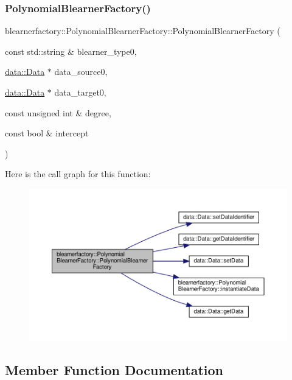 \subsubsection{\texorpdfstring{Polynomial\+Blearner\+Factory()}{PolynomialBlearnerFactory()}}
{\footnotesize\ttfamily blearnerfactory\+::\+Polynomial\+Blearner\+Factory\+::\+Polynomial\+Blearner\+Factory (\begin{DoxyParamCaption}\item[{const std\+::string \&}]{blearner\+\_\+type0,  }\item[{\hyperlink{classdata_1_1_data}{data\+::\+Data} $\ast$}]{data\+\_\+source0,  }\item[{\hyperlink{classdata_1_1_data}{data\+::\+Data} $\ast$}]{data\+\_\+target0,  }\item[{const unsigned int \&}]{degree,  }\item[{const bool \&}]{intercept }\end{DoxyParamCaption})}

Here is the call graph for this function\+:\nopagebreak
\begin{figure}[H]
\begin{center}
\leavevmode
\includegraphics[width=350pt]{classblearnerfactory_1_1_polynomial_blearner_factory_a4db6750e7534eb7731cc3d60350d91cf_cgraph}
\end{center}
\end{figure}


\subsection{Member Function Documentation}
\mbox{\label{classblearnerfactory_1_1_polynomial_blearner_factory_ac0c7f742da0a2de444e91a0cfb0a9384}} 
